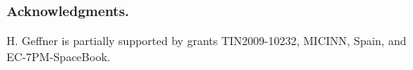 \documentclass[letterpaper]{article}
\newcommand{\Omit}[1]{}
\begin{document}
\Omit{
 MCTS methods suggest the use of alternative leaf expansion 
strategies for problems with very large branching factors; anytime heuristic search methods
suggest  the use of labels and upper bounds for pruning the search, 
the decomposition of the value function  in the form $g+h$ typical of A* \cite{chakrabarti:g+h,hansen:lao}, 
and the use of a heuristic multiplier parameter $W > 1$ possibly adjustable \cite{richter:w,thayer-ruml:anytime}
for speeding up the search for the goal and subsequent pruning.}


\subsubsection{Acknowledgments.}
H. Geffner is partially supported by grants
TIN2009-10232, MICINN, Spain, and EC-7PM-SpaceBook. 






\end{document}
